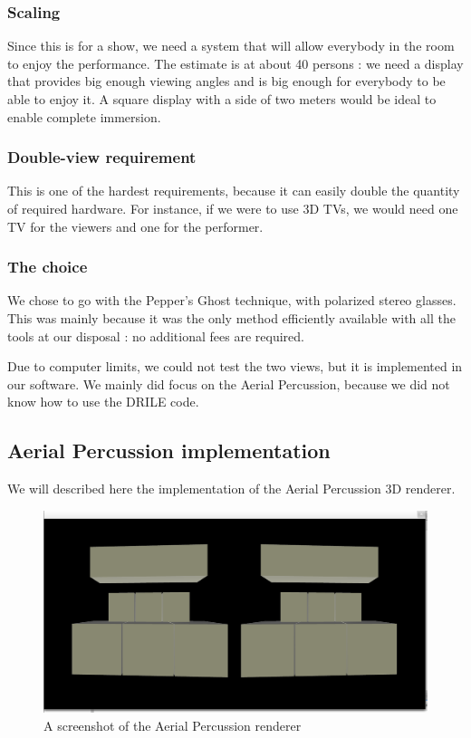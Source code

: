 \subsubsection{Scaling}
Since this is for a show, we need a system that will allow everybody in the room to enjoy the performance. The estimate is at about 40 persons : we need a display that provides big enough viewing angles and is big enough for everybody to be able to enjoy it. A square display with a side of two meters would be ideal to enable complete immersion.
\subsubsection{Double-view requirement}
This is one of the hardest requirements, because it can easily double the quantity of required hardware. For instance, if we were to use 3D TVs, we would need one TV for the viewers and one for the performer.

\subsubsection{The choice}
We chose to go with the Pepper's Ghost technique, with polarized stereo glasses. This was mainly because it was the only method efficiently available with all the tools at our disposal : no additional fees are required.

Due to computer limits, we could not test the two views, but it is implemented in our software. We mainly did focus on the Aerial Percussion, because we did not know how to use the DRILE code. 

\subsection{Aerial Percussion implementation}
We will described here the implementation of the Aerial Percussion 3D renderer.

\begin{figure}[h!]
\centering
\includegraphics[scale=0.3]{image/percuScreen.png}
\caption{A screenshot of the Aerial Percussion renderer}
\label{fig:percScreen}
\end{figure}

